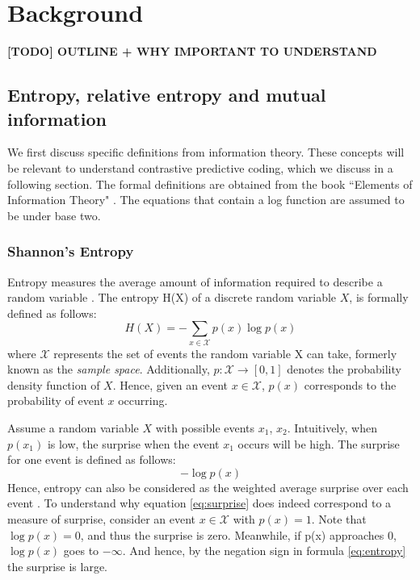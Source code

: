
\chapter{Background}

\textbf{[TODO] OUTLINE + WHY IMPORTANT TO UNDERSTAND}

\section{Entropy, relative entropy and mutual information}
We first discuss specific definitions from information theory. These concepts will be relevant to understand contrastive predictive coding, which we discuss in a following section. The formal definitions are obtained from the book ``Elements of Information Theory" \cite{coverElementsInformationTheory2006}. The equations that contain a log function are assumed to be under base two.
\subsection{Shannon's Entropy}
Entropy measures the average amount of information required to describe a random variable \cite{coverElementsInformationTheory2006}. The entropy H(X) of a discrete random variable $X$, is formally defined as follows: 
\begin{equation}
	H(X) = -\sum_{x\in\mathcal{X}} p(x) \log p(x)  \label{eq:entropy}
\end{equation}
where $\mathcal{X}$ represents the set of events the random variable X can take, formerly known as the \textit{sample space}. Additionally, $p: \mathcal{X} \rightarrow [0, 1]$ denotes the probability density function of $X$. Hence, given an event $ x \in \mathcal{X}$, $p(x)$ corresponds to the probability of event $x$ occurring.

Assume a random variable $X$ with possible events $x_1$, $x_2$. Intuitively, when $p(x_1)$ is low, the surprise when the event $x_1$ occurs will be high. The surprise for one event is defined as follows:
\begin{equation}
	- \log p(x) \label{eq:surprise}
\end{equation}
Hence, entropy can also be considered as the weighted average surprise over each event \cite{datasciencecoursesAliGhodsiLec2017}. 
To understand why equation \ref{eq:surprise} does indeed correspond to a measure of surprise, consider an event $x \in \mathcal{X}$ with $p(x) = 1$. Note that $\log p(x) = 0$, and thus the surprise is zero. Meanwhile, if p(x) approaches $0$, $\log p(x)$ goes to $- \infty$. And hence, by the negation sign in formula \ref{eq:entropy} the surprise is large.


